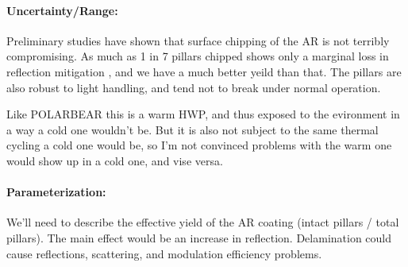 \paragraph{Uncertainty/Range:}

Preliminary studies have shown that surface chipping of the AR is not terribly compromising. As much as 1 in 7 pillars chipped shows only a marginal loss in reflection mitigation \cite{SiAR_1}, and we have a much better yeild than that.  The pillars are also robust to light handling, and tend not to break under normal operation.

Like POLARBEAR this is a warm HWP, and thus exposed to the evironment in a way a cold one wouldn't be. But it is also not subject to the same thermal cycling a cold one would be, so I'm not convinced problems with the warm one would show up in a cold one, and vise versa.

\paragraph{Parameterization:}
We'll need to describe the effective yield of the AR coating (intact pillars / total pillars). The main effect would be an increase in reflection. Delamination could cause reflections, scattering, and modulation efficiency problems.  
